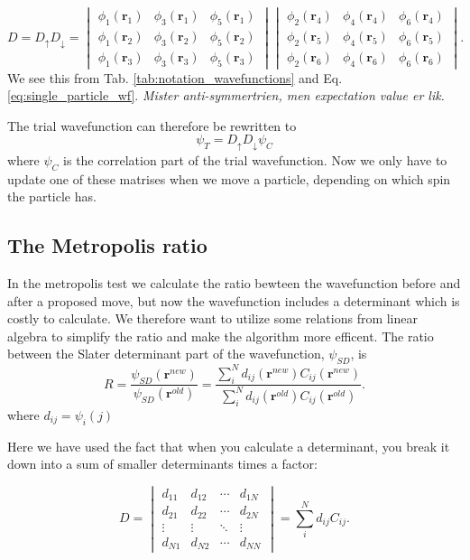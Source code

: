 $$ D = D_\uparrow D_\downarrow = \begin{vmatrix}
  \phi_{1}(\bm{r}_1) & \phi_{3}(\bm{r}_1) & \phi_{5}(\bm{r}_1) \\
  \phi_{1}(\bm{r}_2) & \phi_{3}(\bm{r}_2) &  \phi_{5}(\bm{r}_2) \\
  \phi_{1}(\bm{r}_3) & \phi_{3}(\bm{r}_3) & \phi_{5}(\bm{r}_3)
\end{vmatrix}\begin{vmatrix}
  \phi_{2}(\bm{r}_4) & \phi_{4}(\bm{r}_4) & \phi_{6}(\bm{r}_4) \\
  \phi_{2}(\bm{r}_5) & \phi_{4}(\bm{r}_5) &  \phi_{6}(\bm{r}_5) \\
  \phi_{2}(\bm{r}_6) & \phi_{4}(\bm{r}_6) & \phi_{6}(\bm{r}_6)
\end{vmatrix}.
$$
We see this from Tab. \ref{tab:notation_wavefunctions} and Eq. \ref{eq:single_particle_wf}.
\textit{Mister anti-symmertrien, men expectation value er lik. } 

The trial wavefunction can therefore be rewritten to 
$$ \psi_T = D_\uparrow D_\downarrow \psi_C $$ where $\psi_C$ is the correlation part of the trial wavefunction. Now we only have to update one of these matrises when we move a particle, depending on which spin the particle has. 
 
\subsection{The Metropolis ratio}

In the metropolis test we calculate the ratio bewteen the wavefunction before and after a proposed move, but now the wavefunction includes a determinant which is costly to calculate. We therefore want to utilize some relations from linear algebra to simplify the ratio and make the algorithm more efficent. The ratio between the Slater determinant part of the wavefunction, $\psi_{SD}$, is
\begin{equation}\label{eq:metropolis_ratio}
R = \frac{\psi_{SD}(\bm{r}^{new})}{\psi_{SD}(\bm{r}^{old})} = \frac{\sum_i^N d_{ij}(\bm{r}^{new})C_{ij}(\bm{r}^{new})}{\sum_i^N d_{ij}(\bm{r}^{old})C_{ij}(\bm{r}^{old})}.
\end{equation} where $d_{ij} = \psi_i(j)$

Here we have used the fact that when you calculate a determinant, you break it down into a sum of smaller determinants times a factor:

\begin{equation*}
D = 
 \begin{vmatrix}
  d_{11} & d_{12} & \cdots & d_{1N} \\
  d_{21} & d_{22} & \cdots & d_{2N} \\
  \vdots  & \vdots  & \ddots & \vdots  \\
  d_{N1} & d_{N2} & \cdots & d_{NN} 
\end{vmatrix} = \sum_i^N d_{ij}C_{ij}. %
\end{equation*}

